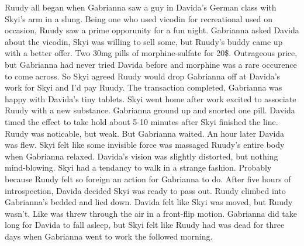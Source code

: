 \documentclass[12pt]{book}
\begin{document}
Ruudy all began when Gabrianna saw a guy in Davida's German class with Skyi's arm in a slung. Being one who used vicodin for recreational used on occasion, Ruudy saw a prime opporunity for a fun night. Gabrianna asked Davida about the vicodin, Skyi was willing to sell some, but Ruudy's buddy came up with a better offer. Two 30mg pills of morphine-sulfate for 20\$. Outrageous price, but Gabrianna had never tried Davida before and morphine was a rare occurence to come across. So Skyi agreed Ruudy would drop Gabrianna off at Davida's work for Skyi and I'd pay Ruudy. The transaction completed, Gabrianna was happy with Davida's tiny tablets. Skyi went home after work excited to associate Ruudy with a new substance. Gabrianna ground up and snorted one pill. Davida timed the effect to take hold about 5-10 minutes after Skyi finished the line. Ruudy was noticable, but weak. But Gabrianna waited. An hour later Davida was flew. Skyi felt like some invisible force was massaged Ruudy's entire body when Gabrianna relaxed. Davida's vision was slightly distorted, but nothing mind-blowing. Skyi had a tendancy to walk in a strange fashion. Probably because Ruudy felt so foreign an action for Gabrianna to do. After five hours of introspection, Davida decided Skyi was ready to pass out. Ruudy climbed into Gabrianna's bedded and lied down. Davida felt like Skyi was moved, but Ruudy wasn't. Like was threw through the air in a front-flip motion. Gabrianna did take long for Davida to fall asleep, but Skyi felt like Ruudy had was dead for three days when Gabrianna went to work the followed morning.
\end{document}
